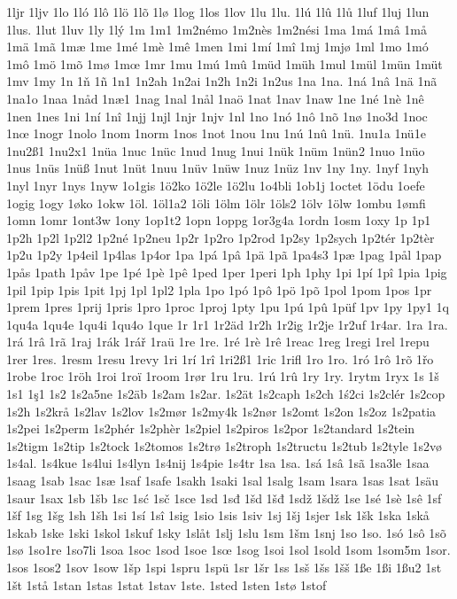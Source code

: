 1ljr
1ljv
1lo
1ló
1lô
1lö
1lõ
1lø
1log
1los
1lov
1lu
1lu.
1lú
1lû
1lů
1luf
1luj
1lun
1lus.
1lut
1luv
1ly
1lý
1m
1m1
1m2némo
1m2nès
1m2nési
1ma
1má
1mâ
1må
1mä
1mã
1mæ
1me
1mé
1mè
1mê
1men
1mi
1mí
1mî
1mj
1mjø
1ml
1mo
1mó
1mô
1mö
1mõ
1mø
1mœ
1mr
1mu
1mú
1mû
1müd
1müh
1mul
1mül
1mün
1müt
1mv
1my
1n
1ň
1ñ
1n1
1n2ah
1n2ai
1n2h
1n2i
1n2us
1na
1na.
1ná
1nâ
1nä
1nã
1na1o
1naa
1nåd
1næ1
1nag
1nal
1nål
1naö
1nat
1nav
1naw
1ne
1né
1nè
1nê
1nen
1nes
1ni
1ní
1nî
1njj
1njl
1njr
1njv
1nl
1no
1nó
1nô
1nõ
1nø
1no3d
1noc
1nœ
1nogr
1nolo
1nom
1norm
1nos
1not
1nou
1nu
1nú
1nû
1nü.
1nu1a
1nü1e
1nu2ß1
1nu2x1
1nüa
1nuc
1nüc
1nud
1nug
1nui
1nük
1nüm
1nün2
1nuo
1nüo
1nus
1nüs
1nüß
1nut
1nüt
1nuu
1nüv
1nüw
1nuz
1nüz
1nv
1ny
1ny.
1nyf
1nyh
1nyl
1nyr
1nys
1nyw
1o1gis
1ö2ko
1ö2le
1ö2lu
1o4bli
1ob1j
1octet
1ödu
1oefe
1ogig
1ogy
1øko
1okw
1öl.
1öl1a2
1öli
1ölm
1ölr
1öls2
1ölv
1ölw
1ombu
1ømfi
1omn
1omr
1ont3w
1ony
1op1t2
1opn
1oppg
1or3g4a
1ordn
1osm
1oxy
1p
1p1
1p2h
1p2l
1p2l2
1p2né
1p2neu
1p2r
1p2ro
1p2rod
1p2sy
1p2sych
1p2tér
1p2tèr
1p2u
1p2y
1p4eil
1p4las
1p4or
1pa
1pá
1pâ
1pä
1pã
1pa4s3
1pæ
1pag
1pål
1pap
1pås
1path
1påv
1pe
1pé
1pè
1pê
1ped
1per
1peri
1ph
1phy
1pi
1pí
1pî
1pia
1pig
1pil
1pip
1pis
1pit
1pj
1pl
1pl2
1pla
1po
1pó
1pô
1pö
1põ
1pol
1pom
1pos
1pr
1prem
1pres
1prij
1pris
1pro
1proc
1proj
1pty
1pu
1pú
1pû
1püf
1pv
1py
1py1
1q
1qu4a
1qu4e
1qu4i
1qu4o
1que
1r
1r1
1r2äd
1r2h
1r2ig
1r2je
1r2uf
1r4ar.
1ra
1ra.
1rá
1râ
1rã
1raj
1rák
1rář
1raü
1re
1re.
1ré
1rè
1rê
1reac
1reg
1regi
1rel
1repu
1rer
1res.
1resm
1resu
1revy
1ri
1rí
1rî
1ri2ß1
1ric
1rifl
1ro
1ro.
1ró
1rô
1rõ
1řo
1robe
1roc
1röh
1roi
1roï
1room
1rør
1ru
1ru.
1rú
1rû
1ry
1ry.
1rytm
1ryx
1s
1š
1s1
1ş1
1s2
1s2a5ne
1s2äb
1s2am
1s2ar.
1s2ät
1s2caph
1s2ch
1ś2ci
1s2clér
1s2cop
1s2h
1s2krå
1s2lav
1s2lov
1s2mør
1s2my4k
1s2nør
1s2omt
1s2on
1s2oz
1s2patia
1s2pei
1s2perm
1s2phér
1s2phèr
1s2piel
1s2piros
1s2por
1s2tandard
1s2tein
1s2tigm
1s2tip
1s2tock
1s2tomos
1s2trø
1s2troph
1s2tructu
1s2tub
1s2tyle
1s2vø
1s4al.
1s4kue
1s4lui
1s4lyn
1s4nij
1s4pie
1s4tr
1sa
1sa.
1sá
1sâ
1sã
1sa3le
1saa
1saag
1sab
1sac
1sæ
1saf
1safe
1sakh
1saki
1sal
1salg
1sam
1sara
1sas
1sat
1säu
1saur
1sax
1sb
1šb
1sc
1sć
1sč
1sce
1sd
1sđ
1šd
1šđ
1sdž
1šdž
1se
1sé
1sè
1sê
1sf
1šf
1sg
1šg
1sh
1šh
1si
1sí
1sî
1sig
1sio
1sis
1siv
1sj
1šj
1sjer
1sk
1šk
1ska
1skå
1skab
1ske
1ski
1skol
1skuf
1sky
1slåt
1slj
1slu
1sm
1šm
1snj
1so
1so.
1só
1sô
1sõ
1sø
1so1re
1so7li
1soa
1soc
1sod
1soe
1sœ
1sog
1soi
1sol
1sold
1som
1som5m
1sor.
1sos
1sos2
1sov
1sow
1šp
1spi
1spru
1spü
1sr
1šr
1ss
1sš
1šs
1šš
1ße
1ßi
1ßu2
1st
1št
1stå
1stan
1stas
1stat
1stav
1ste.
1sted
1sten
1stø
1stof
